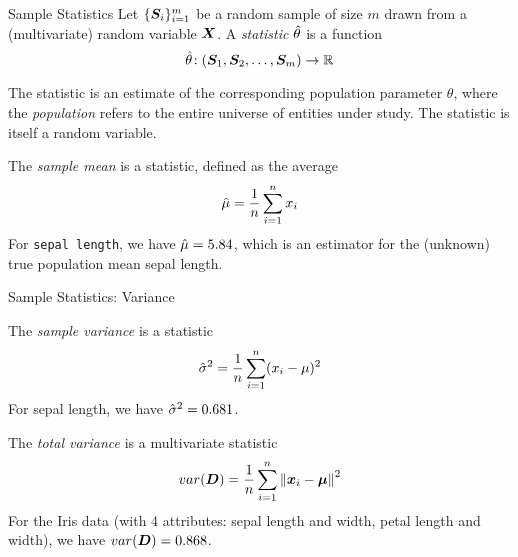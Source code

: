\begin{frame}{Sample Statistics}
  \small
Let
$\{{\boldsymbol S}_i\}_{i=1}^m$
be a random sample of size $m$ drawn from a (multivariate) random
variable ${\boldsymbol X}$. A {\em statistic} $\hat{\theta}$ is a function
$$\hat{\theta}\!: ({\boldsymbol S}_1, {\boldsymbol S}_2, \ldots, {\boldsymbol S}_m) \to {\mathord{\mathbb R}}$$

The statistic is an estimate of the corresponding population parameter
$\theta$, where the {\em population} refers to the entire universe of
entities under study. The statistic is itself a random variable.

\bigskip
The {\em sample mean} is a statistic, def\/{i}ned as the average
    $$\hat{\mu} = {1 \over n} \sum_{i=1}^n x_i$$
	For {\tt sepal length}, we have
	$\hat{\mu} = 5.84$,
	which is an estimator for the (unknown) true population mean sepal
	length.
\end{frame}

\begin{frame}{Sample Statistics: Variance}

The {\em sample variance} is a statistic
	$$\hat{\sigma}^2 = {1 \over n} \sum_{i=1}^n (x_i-\mu)^2$$
For sepal length, we have $\hat{\sigma}^2 =0.681$.

\medskip
The {\em total variance} is a multivariate statistic
$$var({\boldsymbol D}) = {1 \over n} \sum_{i=1}^n \left\lVert{\boldsymbol x}_i-{\bm \mu}\right\rVert^2$$
For the Iris data (with 4 attributes: sepal length and width, petal
length and width), we have $var({\boldsymbol D}) =0.868$.

\end{frame}
